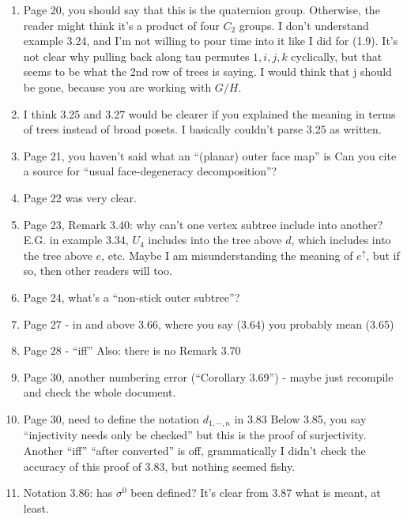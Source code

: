 \documentclass{article}
\begin{document}
\begin{enumerate}
\item
Page 20, you should say that this is the quaternion group. Otherwise, the reader might think it's a product of four $C_2$ groups.
I don't understand example 3.24, and I'm not willing to pour time into it like I did for (1.9). It's not clear why pulling back along tau permutes $1,i,j,k$ cyclically, but that seems to be what the 2nd row of trees is saying. I would think that j should be gone, because you are working with $G/H$.

\item
I think 3.25 and 3.27 would be clearer if you explained the meaning in terms of trees instead of broad posets. I basically couldn't parse 3.25 as written. 

\item
Page 21, you haven't said what an ``(planar) outer face map'' is
Can you cite a source for ``usual face-degeneracy decomposition''?

\item
Page 22 was very clear.

\item
Page 23, Remark 3.40: why can't one vertex subtree include into another? E.G. in example 3.34, $U_4$ includes into the tree above $d$, which includes into the tree above $e$, etc. Maybe I am misunderstanding the meaning of $e^\uparrow$, but if so, then other readers will too.

\item
Page 24, what's a ``non-stick outer subtree''?

\item
Page 27 - in and above 3.66, where you say (3.64) you probably mean (3.65)

\item
Page 28 - ``iff''
Also: there is no Remark 3.70

\item
Page 30, another numbering error (``Corollary 3.69'') - maybe just recompile and check the whole document.

\item
Page 30, need to define the notation $d_{1,\cdots,n}$ in 3.83
Below 3.85, you say ``injectivity needs only be checked'' but this is the proof of surjectivity.
Another ``iff''
``after converted'' is off, grammatically
I didn't check the accuracy of this proof of 3.83, but nothing seemed fishy.

\item
Notation 3.86: has $\sigma^0$ been defined?
It's clear from 3.87 what is meant, at least.


\end{enumerate}
\end{document}
